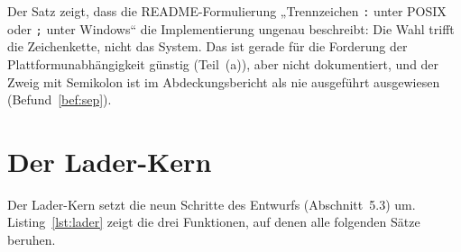 Der Satz zeigt, dass die README-Formulierung „Trennzeichen \texttt{:} unter POSIX oder \texttt{;} unter Windows“ die Implementierung ungenau beschreibt: Die Wahl trifft die Zeichenkette, nicht das System. Das ist gerade für die Forderung der Plattformunabhängigkeit günstig (Teil~(a)), aber nicht dokumentiert, und der Zweig mit Semikolon ist im Abdeckungsbericht als nie ausgeführt ausgewiesen (Befund~\ref{bef:sep}).

\chapter{Der Lader-Kern}
\label{chap:lader}

Der Lader-Kern setzt die neun Schritte des Entwurfs (Abschnitt~5.3) um. Listing~\ref{lst:lader} zeigt die drei Funktionen, auf denen alle folgenden Sätze beruhen.

